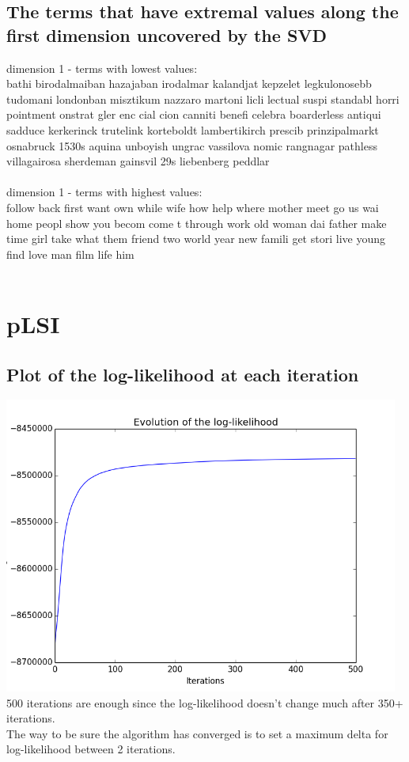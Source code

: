 \documentclass[11pt]{article} %
\begin{document}
\subsection{The terms that have extremal values along the first dimension uncovered by the SVD}
dimension 1 - terms with lowest values:\\
bathi birodalmaiban hazajaban irodalmar kalandjat kepzelet legkulonosebb tudomani londonban misztikum nazzaro martoni licli lectual suspi standabl horri pointment onstrat gler enc cial cion canniti benefi celebra boarderless antiqui sadduce kerkerinck trutelink korteboldt lambertikirch prescib prinzipalmarkt osnabruck 1530s aquina unboyish ungrac vassilova nomic rangnagar pathless villagairosa sherdeman gainsvil 29s liebenberg peddlar \\
\\
dimension 1 - terms with highest values:\\
follow back first want own while wife how help where mother meet go us wai home peopl show you becom come t through work old woman dai father make time girl take what them friend two world year new famili get stori live young find love man film life him \\
\\ 
\section{pLSI}
\subsection{Plot of the log-likelihood at each iteration}
\includegraphics[width=13cm]{output/loglikelihood}
\\
500 iterations are enough since the log-likelihood doesn't change much after 350+ iterations.\\
The way to be sure the algorithm has converged is to set a maximum delta for log-likelihood between 2 iterations.\\
\end{document}
